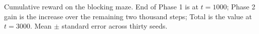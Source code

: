 \begin{table}[ht]
  \centering
  \caption{Cumulative reward on the blocking maze. End of Phase 1 is at $t = 1000$; Phase 2 gain is the increase over the remaining two thousand steps; Total is the value at $t = 3000$. Mean $\pm$ standard error across thirty seeds.}
  \label{table:fc_dyna_maze}
  
\end{table}
